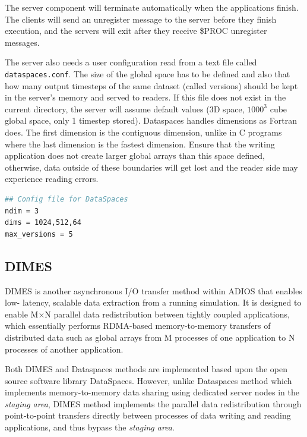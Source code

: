 The server component will terminate automatically when the applications finish. 
The clients  will send an unregister message to the server before 
they finish execution, and the servers will exit after they receive \$PROC unregister 
messages.

The server also needs a user configuration read from a text file called \verb+dataspaces.conf+. The size of the global space has to be defined and also that how many output timesteps of the same dataset (called versions) should be kept in the server's memory and served to readers. If this file does not exist in the current directory, the server will assume default values (3D space, $1000^3$ cube global space, only 1 timestep stored). Dataspaces handles dimensions as Fortran does. The first dimension is the contiguous dimension, unlike in C programs where the last dimension is the fastest dimension. Ensure that the writing application does not create larger global arrays than this space defined, otherwise, data outside of these boundaries will get lost and the reader side may experience reading errors.

\begin{lstlisting}[language=bash, caption=''Example configuration file dataspaces.conf. Dimension order is Fortran order.'']
## Config file for DataSpaces
ndim = 3
dims = 1024,512,64
max_versions = 5
\end{lstlisting}


\subsection{DIMES}
\label{section-method-dimes}
DIMES is another asynchronous I/O transfer method within ADIOS that enables low-
latency, scalable data extraction from a running simulation. It is designed to enable M$
\times$N parallel data redistribution between tightly coupled applications, which 
essentially performs RDMA-based memory-to-memory transfers of distributed data such 
as global arrays from M processes of one application to N processes of another application.

Both DIMES and Dataspaces methods are implemented based upon the open source 
software library DataSpaces. However, unlike Dataspaces method which implements 
memory-to-memory data sharing using dedicated server nodes in the \emph{staging 
area}, DIMES method implements the parallel data redistribution through point-to-point 
transfers directly between processes of data writing and reading applications, and thus 
bypass the \emph{staging area}. 

